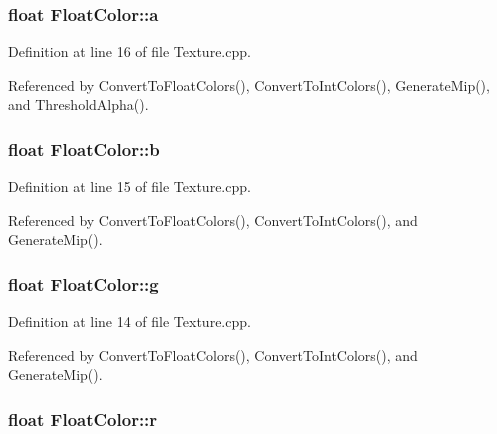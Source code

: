 \subsubsection[{\texorpdfstring{a}{a}}]{\setlength{\rightskip}{0pt plus 5cm}float Float\+Color\+::a}\hypertarget{struct_float_color_a3e01752ebeb65af08f7f554551d6323a}{}\label{struct_float_color_a3e01752ebeb65af08f7f554551d6323a}


Definition at line 16 of file Texture.\+cpp.



Referenced by Convert\+To\+Float\+Colors(), Convert\+To\+Int\+Colors(), Generate\+Mip(), and Threshold\+Alpha().

\subsubsection[{\texorpdfstring{b}{b}}]{\setlength{\rightskip}{0pt plus 5cm}float Float\+Color\+::b}\hypertarget{struct_float_color_afb5d780447f83234de2518a3faebc401}{}\label{struct_float_color_afb5d780447f83234de2518a3faebc401}


Definition at line 15 of file Texture.\+cpp.



Referenced by Convert\+To\+Float\+Colors(), Convert\+To\+Int\+Colors(), and Generate\+Mip().

\subsubsection[{\texorpdfstring{g}{g}}]{\setlength{\rightskip}{0pt plus 5cm}float Float\+Color\+::g}\hypertarget{struct_float_color_add6d6df001ec5ccc130b5abfcc820ee5}{}\label{struct_float_color_add6d6df001ec5ccc130b5abfcc820ee5}


Definition at line 14 of file Texture.\+cpp.



Referenced by Convert\+To\+Float\+Colors(), Convert\+To\+Int\+Colors(), and Generate\+Mip().

\subsubsection[{\texorpdfstring{r}{r}}]{\setlength{\rightskip}{0pt plus 5cm}float Float\+Color\+::r}\hypertarget{struct_float_color_a5bb450f1e1a855b6bf50b436e078252b}{}\label{struct_float_color_a5bb450f1e1a855b6bf50b436e078252b}


